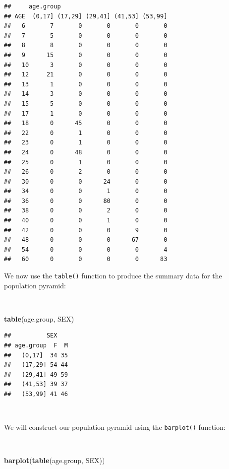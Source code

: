 \documentclass[12pt,a4paper]{book}
\newenvironment{Shaded}{\begin{snugshade}}{\end{snugshade}}
\newcommand{\KeywordTok}[1]{\textcolor[rgb]{0.13,0.29,0.53}{\textbf{#1}}}
\newcommand{\NormalTok}[1]{#1}
\theoremstyle{definition}
\theoremstyle{definition}
\theoremstyle{definition}
\theoremstyle{remark}
\begin{document}
\begin{verbatim}
##     age.group
## AGE  (0,17] (17,29] (29,41] (41,53] (53,99]
##   6       7       0       0       0       0
##   7       5       0       0       0       0
##   8       8       0       0       0       0
##   9      15       0       0       0       0
##   10      3       0       0       0       0
##   12     21       0       0       0       0
##   13      1       0       0       0       0
##   14      3       0       0       0       0
##   15      5       0       0       0       0
##   17      1       0       0       0       0
##   18      0      45       0       0       0
##   22      0       1       0       0       0
##   23      0       1       0       0       0
##   24      0      48       0       0       0
##   25      0       1       0       0       0
##   26      0       2       0       0       0
##   30      0       0      24       0       0
##   34      0       0       1       0       0
##   36      0       0      80       0       0
##   38      0       0       2       0       0
##   40      0       0       1       0       0
##   42      0       0       0       9       0
##   48      0       0       0      67       0
##   54      0       0       0       0       4
##   60      0       0       0       0      83
\end{verbatim}

\newpage

We now use the \texttt{table()} function to produce the summary data for
the population pyramid:

~

\begin{Shaded}
\begin{Highlighting}[]
\KeywordTok{table}\NormalTok{(age.group, SEX)}
\end{Highlighting}
\end{Shaded}

\begin{verbatim}
##          SEX
## age.group  F  M
##   (0,17]  34 35
##   (17,29] 54 44
##   (29,41] 49 59
##   (41,53] 39 37
##   (53,99] 41 46
\end{verbatim}

~

We will construct our population pyramid using the \texttt{barplot()}
function:

~

\begin{Shaded}
\begin{Highlighting}[]
\KeywordTok{barplot}\NormalTok{(}\KeywordTok{table}\NormalTok{(age.group, SEX))}
\end{Highlighting}
\end{Shaded}
\end{document}
